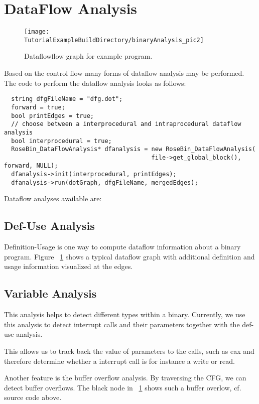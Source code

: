 \section{DataFlow Analysis}

\begin{figure}
\texttt{[image: \\TutorialExampleBuildDirectory/binaryAnalysis\_pic2]}
\caption{Dataflowflow graph for example program.}
\label{Tutorial:examplefig2}
\end{figure}

Based on the control flow many forms of dataflow analysis may be performed.
The code to perform the dataflow analysis looks as follows:

{\mySmallFontSize
\begin{verbatim}
  string dfgFileName = "dfg.dot";
  forward = true;
  bool printEdges = true;
  // choose between a interprocedural and intraprocedural dataflow analysis
  bool interprocedural = true;
  RoseBin_DataFlowAnalysis* dfanalysis = new RoseBin_DataFlowAnalysis(
                                         file->get_global_block(), forward, NULL);
  dfanalysis->init(interprocedural, printEdges);
  dfanalysis->run(dotGraph, dfgFileName, mergedEdges);
\end{verbatim}
}

Dataflow analyses available are:
 
\subsection{Def-Use Analysis}

Definition-Usage is one way to compute dataflow information about a binary program.
Figure ~\ref{Tutorial:examplefig2} shows a typical dataflow graph with additional 
definition and usage information visualized at the edges.

\subsection{Variable Analysis}

This analysis helps to detect different types within a binary.
Currently, we use this analysis to detect interrupt calls and their parameters together with the def-use analysis.

This allows us to track back the value of parameters to the calls, such as eax and therefore 
determine whether a interrupt call is for instance a write or read.

Another feature is the buffer overflow analysis. By traversing the CFG, we can detect buffer overflows.
The black node in ~\ref{Tutorial:examplefig2} shows such a buffer overlow, cf. source code above.









